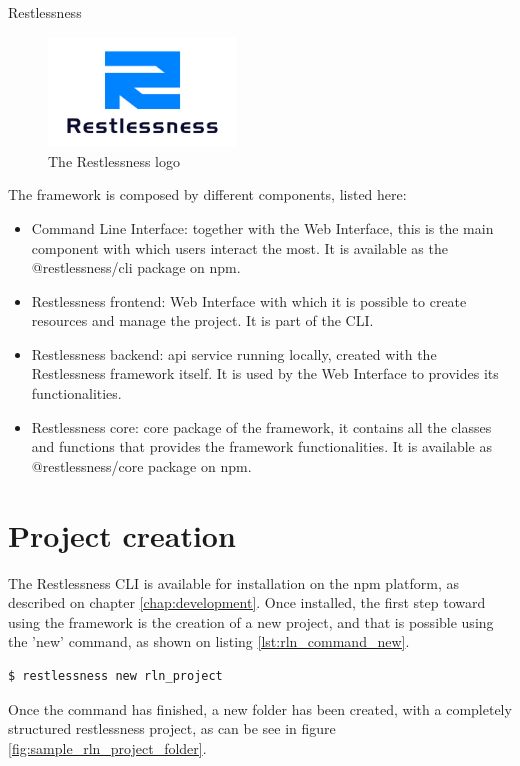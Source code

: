 \begin{chapter}{Restlessness}
    \label{chap:restlessness}

    \begin{figure}
        \centering
        \includegraphics[width=5cm]{source/images/restlessness_logo.png}
        \caption{The Restlessness logo}
    \end{figure}

    The framework is composed by different components, listed here:
    \begin{itemize}
        \item Command Line Interface: together with the Web Interface, this is the
            main component with which users interact the most. It is available as
            the @restlessness/cli package on npm.
        \item Restlessness frontend: Web Interface with which it is possible to
            create resources and manage the project. It is part of the CLI.
        \item Restlessness backend: api service running locally, created with the
            Restlessness framework itself. It is used by the Web Interface to
            provides its functionalities.
        \item Restlessness core: core package of the framework, it contains all the
            classes and functions that provides the framework functionalities. It is
            available as @restlessness/core package on npm.
    \end{itemize}

    \section{Project creation}
    The Restlessness CLI is available for installation on the npm platform, as described
    on chapter \ref{chap:development}. %
    Once installed, the first step toward using the framework is
    the creation of a new project, and that is possible using the 'new' command, as shown
    on listing \ref{lst:rln_command_new}.
    \begin{lstlisting}[caption=New command, label={lst:rln_command_new}]
$ restlessness new rln_project
    \end{lstlisting}
    Once the command has finished, a new folder has been created, with a completely
    structured restlessness project, as can be see in figure \ref{fig:sample_rln_project_folder}.


\end{chapter}
